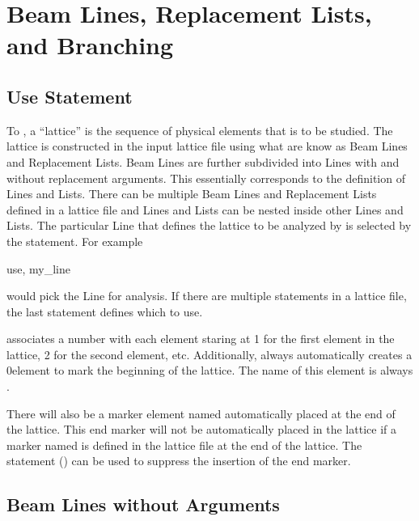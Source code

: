 \chapter{Beam Lines, Replacement Lists, and Branching}
\label{c:sequence}

\section{Use Statement}
\label{s:use}

To \bmad, a ``lattice'' is the sequence of physical
elements that is to be studied. The lattice is constructed in the
input lattice file using what are know as Beam Lines and Replacement
Lists. Beam Lines are further subdivided into Lines with and without
replacement arguments. This essentially corresponds to the \mad
definition of Lines and Lists. There can be multiple Beam Lines and
Replacement Lists defined in a lattice file and Lines and Lists can be
nested inside other Lines and Lists. The particular Line that defines
the lattice to be analyzed by \bmad is selected by the 
statement. For example
\begin{example}
  use, my_line
\end{example}
would pick the Line  for analysis. If there are multiple 
statements in a lattice file, the last  statement defines which
 to use.

\bmad associates a number with each element staring at 1 for the first
element in the lattice, 2 for the second element, etc. Additionally,
\bmad always automatically creates a 0\Th element to mark the
beginning of the lattice. The name of this element is always
. 

There will also be a marker element named  automatically
placed at the end of the lattice. This end marker will not be
automatically placed in the lattice if a marker named  is
defined in the lattice file at the end of the lattice. The
 statement () can be used
to suppress the insertion of the end marker.

\section{Beam Lines without Arguments}
\label{s:lines.wo.arg}

